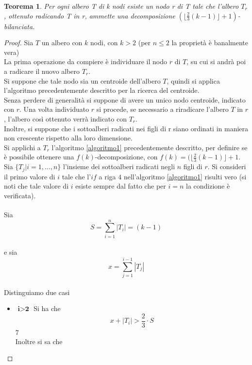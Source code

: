 \newtheorem{teorema1}[definizione]{Teorema}
\begin{teorema1}
Per ogni albero T di k nodi esiste un nodo r di T  tale che l'albero $T_r$, ottenuto radicando T in r, ammette una decomposizione $ (\lfloor \frac{2}{3}(k-1) \rfloor + 1)$-bilanciata.
\end{teorema1}\mbox{}
\begin{proof}
	Sia $ T $ un albero con $ k $ nodi, con $ k>2 $ (per $n\le2$ la propriet\`a \`e banalmente vera) \\
	La prima operazione da compiere \`e individuare il nodo $ r $ di $ T $, su cui si andr\`a poi a radicare il nuovo albero $ T_r $.\\
	Si suppone che tale nodo sia un centroide dell'albero $ T $, quindi si applica l'algoritmo precedentemente descritto per la ricerca del centroide.\\ 
	Senza perdere di generalit\`a si suppone di avere un unico nodo centroide, indicato con $ r $.
	Una volta individuato $ r $ si procede, se necessario a riradicare l'albero $ T $ in $ r $, l'albero cos\`i ottenuto verr\`a indicato con $ T_r $.\\ 
	Inoltre, si suppone che i sottoalberi radicati nei figli di r siano ordinati in maniera non crescente rispetto alla loro dimensione.\\
	Si applichi a $ T_r $ l'algoritmo \ref{algoritmo1} precedentemente descritto, per definire se \`e possibile ottenere una $ f(k) $-decomposizione, con $ f(k) =
	(\lfloor \frac{2}{3}(k-1) \rfloor + 1  $.
	Sia $ \{T_j | i=1,\dots,n\} $ l'insieme dei sottoalberi radicati negli $ n $ figli di $ r $.
	Si consideri il primo valore di $ i $ tale che l'$ if $ a riga $ 4 $ nell'algoritmo \ref{algoritmo1} risulti vero (si noti che tale valore di $ i $ esiste sempre dal fatto che per $ i = n $ la condizione \`e verificata).\mbox{}\\\\
	Sia 
	\[ S = \sum_{i=1}^{n}{|T_i|} = (k-1 ) \]\\
	e sia
	\[ x = \sum_{j=1}^{i-1}{|T_j|} \]\\
	Distinguiamo due casi
	\begin{itemize}
	\item $\textbf{ i>2 }$ Si ha che
	\\ 
	\begin{equation}\label{1}
		x+|T_i| > \frac{2}{3}\cdot S
	\end{equation}7
\\
	Inoltre si sa che
	\\
	

\end{itemize}
\end{proof}

